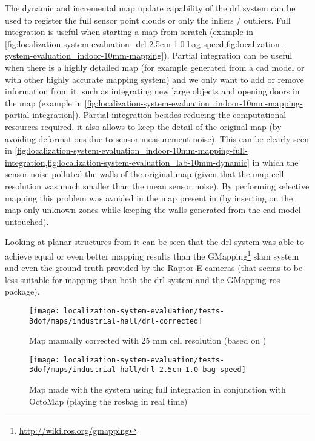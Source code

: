 The dynamic and incremental map update capability of the \gls{drl} system can be used to register the full sensor point clouds or only the inliers / outliers. Full integration is useful when starting a map from scratch (example in \cref{fig:localization-system-evaluation_drl-2.5cm-1.0-bag-speed,fig:localization-system-evaluation_indoor-10mm-mapping}). Partial integration can be useful when there is a highly detailed map (for example generated from a \gls{cad} model or with other highly accurate mapping system) and we only want to add or remove information from it, such as integrating new large objects and opening doors in the map (example in \cref{fig:localization-system-evaluation_indoor-10mm-mapping-partial-integration}). Partial integration besides reducing the computational resources required, it also allows to keep the detail of the original map (by avoiding deformations due to sensor measurement noise). This can be clearly seen in \cref{fig:localization-system-evaluation_indoor-10mm-mapping-full-integration,fig:localization-system-evaluation_lab-10mm-dynamic} in which the sensor noise polluted the walls of the original map (given that the map cell resolution was much smaller than the mean sensor noise). By performing selective mapping this problem was avoided in the map present in  (by inserting on the map only unknown zones while keeping the walls generated from the \gls{cad} model untouched).

Looking at planar structures from  it can be seen that the \gls{drl} system was able to achieve equal or even better mapping results than the GMapping\footnote{\url{http://wiki.ros.org/gmapping}} \gls{slam} system and even the ground truth provided by the Raptor-E cameras (that seems to be less suitable for mapping than both the \gls{drl} system and the GMapping \gls{ros} package).

\begin{figure}[H]
	\centering
	\texttt{[image: localization-system-evaluation/tests-3dof/maps/industrial-hall/drl-corrected]}
	\caption{Map manually corrected with 25 mm cell resolution (based on ) }
	\label{fig:localization-system-evaluation_drl-corrected}
\end{figure}

\begin{figure}[H]
	\centering
	\texttt{[image: localization-system-evaluation/tests-3dof/maps/industrial-hall/drl-2.5cm-1.0-bag-speed]}
	\caption{Map made with the  system using full integration in conjunction with OctoMap (playing the rosbag in real time)}
	\label{fig:localization-system-evaluation_drl-2.5cm-1.0-bag-speed}
\end{figure}


